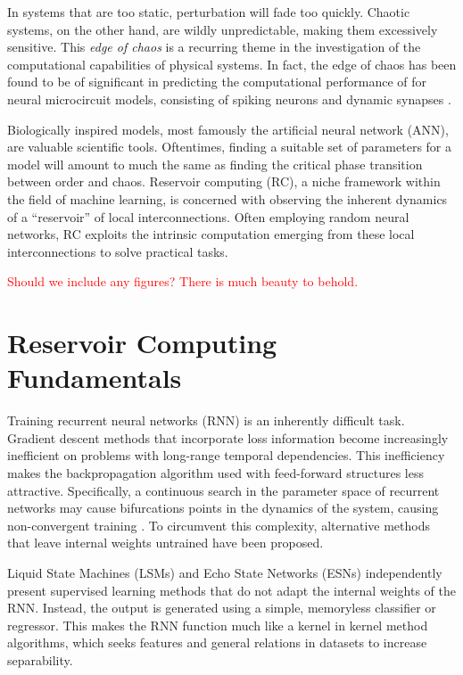 In systems that are too static, perturbation will fade too quickly. Chaotic
systems, on the other hand, are wildly unpredictable, making them excessively
sensitive. This \textit{edge of chaos} is a recurring theme in the investigation
of the computational capabilities of physical systems. In fact, the edge of
chaos has been found to be of significant in predicting the computational
performance of for neural microcircuit models, consisting of spiking neurons and
dynamic synapses \cite{legenstein_edge_2007}.

Biologically inspired models, most famously the artificial neural network (ANN),
are valuable scientific tools. Oftentimes, finding a suitable set of parameters
for a model will amount to much the same as finding the critical phase
transition between order and chaos. Reservoir computing (RC), a niche framework
within the field of machine learning, is concerned with observing the inherent
dynamics of a ``reservoir'' of local interconnections. Often employing random
neural networks, RC exploits the intrinsic computation emerging from these local
interconnections to solve practical tasks.

\textcolor{red}{
  Should we include any figures? There is much beauty to behold.
}

\section{Reservoir Computing Fundamentals}


Training recurrent neural networks (RNN) is an inherently difficult
task. Gradient descent methods that incorporate loss information become
increasingly inefficient on problems with long-range temporal dependencies. This
inefficiency makes the backpropagation algorithm used with feed-forward
structures less attractive. Specifically, a continuous search in the parameter
space of recurrent networks may cause bifurcations points in the dynamics of the
system, causing non-convergent training \cite{doya_bifurcations_nodate}. To
circumvent this complexity, alternative methods that leave internal weights
untrained have been proposed.

Liquid State Machines (LSMs) \cite{maass_real-time_2002} and Echo State Networks
(ESNs) \cite{jaeger_echo_2001} independently present supervised learning methods
that do not adapt the internal weights of the RNN. Instead, the output is
generated using a simple, memoryless classifier or regressor. This makes the RNN
function much like a kernel in kernel method algorithms, which seeks features
and general relations in datasets to increase separability.


